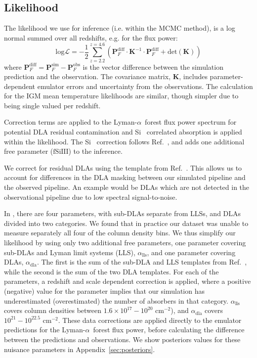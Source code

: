 \documentclass[a4paper,11pt]{article}
\newcommand{\lya}{Lyman-$\alpha$\ }
\begin{document}
\subsection{Likelihood}\label{sec:likelihood}

The likelihood we use for inference (i.e. within the MCMC method), is a log normal summed over all redshifts, e.g. for the flux power:
\begin{equation}
    \mathrm{log}\mathcal{L} = -\frac{1}{2} \sum_{z=2.2}^{z=4.6} \left(\boldsymbol{P}_F^{\mathrm{diff}} \cdot \boldsymbol{K}^{-1} \cdot \boldsymbol{P}_F^{\mathrm{diff}} + \mathrm{det}(\boldsymbol{K})\right)
    \label{eq:likelihood}
\end{equation}
where $\boldsymbol{P}_F^{\mathrm{diff}} = \boldsymbol{P}_F^{\mathrm{sim}} - \boldsymbol{P}_F^{\mathrm{obs}}$ is the vector difference between the simulation prediction and the observation.
The covariance matrix, $\boldsymbol{K}$, includes parameter-dependent emulator errors and uncertainty from the observations.
The calculation for the IGM mean temperature likelihoods are similar, though simpler due to being single valued per redshift.

Correction terms are applied to the \lya forest flux power spectrum for potential DLA residual contamination and Si~{} correlated absorption is applied within the likelihood.
The Si~{} correction follows Ref.~\cite{2006ApJS..163...80M}, and adds one additional free parameter ($\mathrm{fSiIII}$) to the inference.

We correct for residual DLAs using the template from Ref.~\cite{2018MNRAS.474.3032R}. This allows us to account for differences in the DLA masking between our simulated pipeline and the observed pipeline. An example would be DLAs which are not detected in the observational pipeline due to low spectral signal-to-noise.

In \cite{2018MNRAS.474.3032R}, there are four parameters, with sub-DLAs separate from LLSs, and DLAs divided into two categories.
We found that in practice our dataset was unable to measure separately all four of the column density bins. We thus simplify our likelihood by using only two additional free parameters, one parameter covering sub-DLAs and Lyman limit systems (LLS), $\alpha_{\mathrm{lls}}$, and one parameter covering DLAs, $\alpha_{\mathrm{dla}}$. The first is the sum of the sub-DLA and LLS templates from Ref.~\cite{2018MNRAS.474.3032R}, while the second is the sum of the two DLA templates. For each of the parameters, a redshift and scale dependent correction is applied, where a positive (negative) value for the parameter implies that our simulation has underestimated (overestimated) the number of absorbers in that category. $\alpha_{\mathrm{lls}}$ covers column densities between $1.6\times10^{17} - 10^{20}$ cm$^{-2}$), and $\alpha_{\mathrm{dla}}$ covers $10^{21}-10^{22.5}$  cm$^{-2}$. These data corrections are applied directly to the emulator predictions for the \lya forest flux power, before calculating the difference between the predictions and observations.
We show posteriors values for these nuisance parameters in Appendix~\ref{sec:posteriors}.
\end{document}

